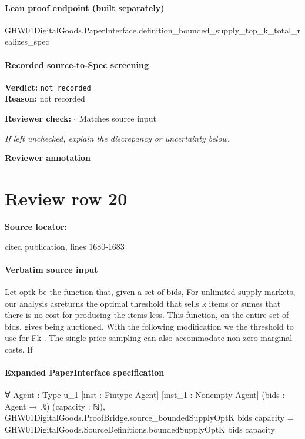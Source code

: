\documentclass[10pt]{article}
\newcommand{\reviewerbox}{%
  \par\noindent\fbox{\parbox{0.96\linewidth}{\rule{0pt}{0.38in}}}\par
}
\newcommand{\reviewmatch}[1]{%
  \par\noindent\textbf{Reviewer check:} $\square$\; #1\par
  \noindent\emph{If left unchecked, explain the discrepancy or uncertainty below.}\par
}
\begin{document}
\paragraph{Lean proof endpoint (built separately)}\begin{ReviewVerbatim}
GHW01DigitalGoods.PaperInterface.definition_bounded_supply_top_k_total_realizes_spec
\end{ReviewVerbatim}

\paragraph{Recorded source-to-Spec screening}
\textbf{Verdict:} \texttt{not recorded}
\\
\textbf{Reason:} not recorded
\reviewmatch{Matches source input}
\noindent\textbf{Reviewer annotation}\par
\reviewerbox
\clearpage
\hypertarget{source-claim-ffcc097a398a48e7}{}
\section*{Review row 20}
\textbf{Source locator:} {\footnotesize\raggedright cited publication, lines 1680-\allowbreak{}1683\par}
\paragraph{Verbatim source input}
\begin{ReviewVerbatim}
Let optk be the function that, given a set of bids,
For unlimited supply markets, our analysis asreturns the optimal threshold that sells k items or sumes that there is no cost for producing the items
less. This function, on the entire set of bids, gives being auctioned. With the following modification we
the threshold to use for Fk . The single-price sampling can also accommodate non-zero marginal costs. If
\end{ReviewVerbatim}


\paragraph{Expanded PaperInterface specification}
\begin{ReviewVerbatim}
∀ {Agent : Type u_1} [inst : Fintype Agent] [inst_1 : Nonempty Agent] (bids : Agent → ℝ) (capacity : ℕ),
  GHW01DigitalGoods.ProofBridge.source_boundedSupplyOptK bids capacity =
    GHW01DigitalGoods.SourceDefinitions.boundedSupplyOptK bids capacity
\end{ReviewVerbatim}
\end{document}
